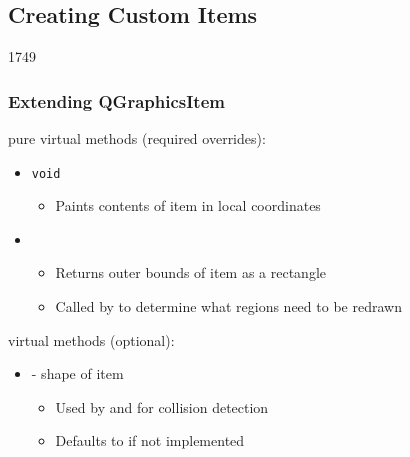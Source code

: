 %
%
%
%

\subsection{Creating Custom Items}
\begin{slide}{1749}

\frametitle{Extending QGraphicsItem}
 pure virtual methods (required overrides):

\begin{itemize}
\item \texttt{void }
    \begin{itemize}
    \item Paints contents of item in local coordinates
    \end{itemize}
\item {} 
    \begin{itemize}
    \item Returns outer bounds of item as a rectangle 
    \item Called by  to determine what regions need to be redrawn

    \end{itemize}
\end{itemize}

 virtual methods (optional):

\begin{itemize}
\item {}  - shape of item
\begin{itemize}   
    \item Used by  and  for collision detection
    \item Defaults to  if not implemented
    \end{itemize}
\end{itemize}
\end{slide}


